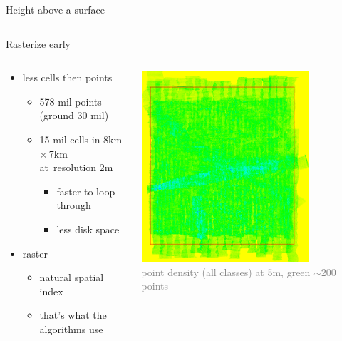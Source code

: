 \documentclass[xcolor={dvipsnames,usenames},beamer,aspectratio=169]{beamer}
\begin{document}
\begin{frame}{Height above a surface}
\begin{columns}
\begin{column}{0.55\textwidth}
\end{column}
\end{columns}

\end{frame}


\begin{frame}{Rasterize early}

\begin{columns}
\begin{column}{0.4\textwidth}

\begin{itemize}
  \item less cells then points
  \begin{itemize}
    \item 578 mil points (ground 30 mil)
    \item 15 mil cells in 8km\,$\times$\,7km at~resolution 2m
    \begin{itemize}
    \item faster to loop through
    \item less disk space
    \end{itemize}
  \end{itemize}
  \item raster
  \begin{itemize}
    \item natural spatial index
    \item that's what the algorithms use
  \end{itemize}
\end{itemize}

\end{column}
\begin{column}{0.45\textwidth}

\begin{center}
  \includegraphics[width=0.75\textwidth]{grass/rinlidar_region}
  \\
  \tiny
  \textcolor{gray}{point density (all classes) at 5m, green $\sim200$ points}
\end{center}


\end{column}
\end{columns}
\end{frame}
\end{document}

